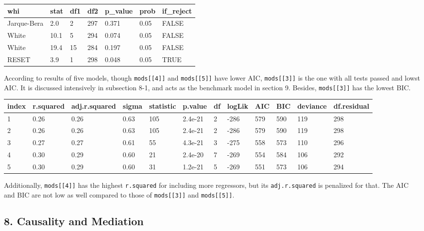 \documentclass[main.tex]{subfiles}
\begin{document}
\begin{table}[H]
\centering
\begin{tabular}{lllllll}
\toprule
whi & stat & df1 & df2 & p\_value & prob & if\_reject\\
\midrule
Jarque-Bera & 2.0 & 2 & 297 & 0.371 & 0.05 & FALSE\\
White & 10.1 & 5 & 294 & 0.074 & 0.05 & FALSE\\
White & 19.4 & 15 & 284 & 0.197 & 0.05 & FALSE\\
RESET & 3.9 & 1 & 298 & 0.048 & 0.05 & TRUE\\
\bottomrule
\end{tabular}
\end{table}

According to results of five models, though \texttt{mods{[}{[}4{]}{]}}
and \texttt{mods{[}{[}5{]}{]}} have lower AIC,
\texttt{mods{[}{[}3{]}{]}} is the one with all tests passed and lowst
AIC. It is discussed intensively in subsection 8-1, and acts as the
benchmark model in section 9. Besides, \texttt{mods{[}{[}3{]}{]}} has
the lowest BIC.

\begin{table}[H]
\centering
\begin{tabular}{llllllllllll}
\toprule
index & r.squared & adj.r.squared & sigma & statistic & p.value & df & logLik & AIC & BIC & deviance & df.residual\\
\midrule
1 & 0.26 & 0.26 & 0.63 & 105 & 2.4e-21 & 2 & -286 & 579 & 590 & 119 & 298\\
2 & 0.26 & 0.26 & 0.63 & 105 & 2.4e-21 & 2 & -286 & 579 & 590 & 119 & 298\\
3 & 0.27 & 0.27 & 0.61 & 55 & 4.3e-21 & 3 & -275 & 558 & 573 & 110 & 296\\
4 & 0.30 & 0.29 & 0.60 & 21 & 2.4e-20 & 7 & -269 & 554 & 584 & 106 & 292\\
5 & 0.30 & 0.29 & 0.60 & 31 & 1.2e-21 & 5 & -269 & 551 & 573 & 106 & 294\\
\bottomrule
\end{tabular}
\end{table}

Additionally, \texttt{mods{[}{[}4{]}{]}} has the highest
\texttt{r.squared} for including more regressors, but its
\texttt{adj.r.squared} is penalized for that. The AIC and BIC are not
low as well compared to those of \texttt{mods{[}{[}3{]}{]}} and
\texttt{mods{[}{[}5{]}{]}}.

\hypertarget{causality-and-mediation}{%
\subsection{8. Causality and Mediation}\label{causality-and-mediation}}
\end{document}
